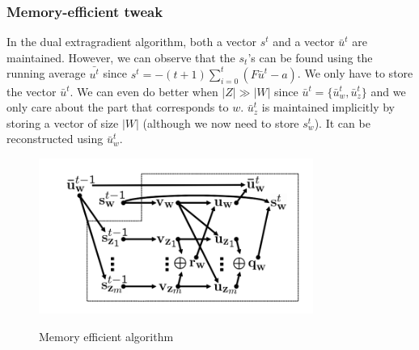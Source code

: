 \subsubsection{Memory-efficient tweak}
In the dual extragradient algorithm, both a vector $s^t$ and a vector
$\bar{u}^t$ are maintained. However, we can observe that the $s_t$'s can be
found using the running average $\bar{u^t}$ since $s^t = -(t + 1 ) \sum_{i=0}^t
(F \bar{u}^t - a)$. We only have to store the vector $\bar{u}^t$. We can even do
better when $|{Z}| \gg |{W}|$ since $\bar{u}^t = \{ \bar{u}_w^t,\bar{u}_z^t \}$
and we only care about the part that corresponds to $w$. $\bar{u}_z^t$ is
maintained implicitly by storing a vector of size $|{W}|$ (although we now need
to store $s_w^t$). It can be reconstructed using $\bar{u}_w^t$.
\begin{figure}
  \includegraphics[width=0.8\textwidth]{figures/mem_tweak.png}
  \label{memtweak}
  \caption{Memory efficient algorithm}
\end{figure}

